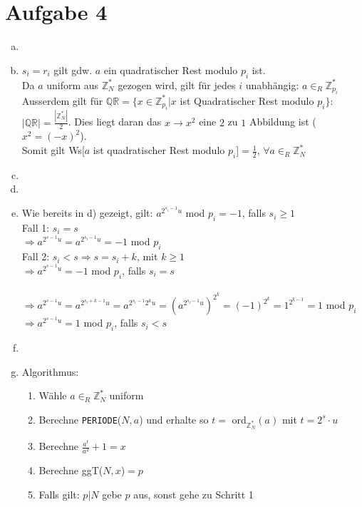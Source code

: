 \documentclass[a4paper]{scrartcl}
\begin{document}
\section*{Aufgabe 4}
\begin{enumerate}[a)]
\item

\item $s_i = r_i$ gilt gdw. $a$ ein quadratischer Rest modulo $p_i$ ist.\\
 Da $a$ uniform aus $\mathbb{Z}_N^*$ gezogen wird, gilt für jedes $i$ unabhängig: $a\in_R\mathbb{Z}_{p_i}^*$\\
Ausserdem gilt für $\mathbb{QR}=\{x\in \mathbb{Z}_{p_i}^*|x$ ist Quadratischer Rest modulo $p_i\}$: $|\mathbb{QR}|=\frac{|\mathbb{Z}_N^*|}{2}$. Dies liegt daran das $x \rightarrow x^2$ eine $2$ zu $1$ Abbildung ist ($x^2=(-x)^2$).\\
Somit gilt Ws[$a$ ist quadratischer Rest modulo $p_i$]$=\frac{1}{2}$, $\forall a\in_R\mathbb{Z}_N^*$

\item

\item

\item Wie bereits in d) gezeigt, gilt: $a^{2^{s_i-1}u}$ mod $ p_i=-1$, falls $s_i\geq 1$\\
Fall 1: $s_i=s$\\
$\Rightarrow a^{2^{s-1}u} = a^{2^{s_i-1}u}=-1$ mod $p_i$\\
Fall 2: $s_i < s \Rightarrow s = s_i+k$, mit $k\geq 1$\\
$\Rightarrow a^{2^{s-1}u} = -1$ mod $p_i$, falls $s_i=s$\\\\
$\Rightarrow a^{2^{s-1}u} = a^{2^{s_i+k-1}u}=a^{2^{s_i-1}2^ku} = (a^{2^{s_i-1}u})^{2^k} = (-1)^{2^k} = 1^{2^{k-1}}= 1$ mod $p_i$\\
$\Rightarrow a^{2^{s-1}u} = 1$ mod $p_i$, falls $s_i<s$
\item 

\item
Algorithmus:\\
\begin{enumerate}[1.]
\item Wähle $a\in_R \mathbb{Z}_N^*$ uniform
\item Berechne \texttt{PERIODE}($N,a$) und erhalte so $t =$ ord$_{\mathbb{Z}_N^*}(a)$ mit $t=2^s\cdot u$
\item Berechne $\frac{a^t}{a^2}+1=x$
\item Berechne ggT($N, x$)$=p$
\item Falls gilt: $p | N$ gebe $p$ aus, sonst gehe zu Schritt 1
\end{enumerate}


\end{enumerate}
\end{document}
